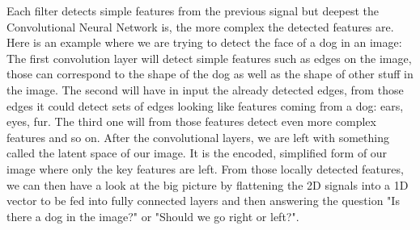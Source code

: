 \documentclass[12pt]{article}
\begin{document}
Each filter detects simple features from the previous signal but deepest the Convolutional Neural Network is, the more complex the detected features are. Here is an example where we are trying to detect the face of a dog in an image: 
The first convolution layer will detect simple features such as edges on the image, those can correspond to the shape of the dog as well as the shape of other stuff in the image. The second will have in input the already detected edges, from those edges it could detect sets of edges looking like features coming from a dog: ears, eyes, fur. The third one will from those features detect even more complex features and so on.
After the convolutional layers, we are left with something called the latent space of our image. It is the encoded, simplified form of our image where only the key features are left. From those locally detected features, we can then have a look at the big picture by flattening the 2D signals into a 1D vector to be fed into fully connected layers and then answering the question "Is there a dog in the image?" or "Should we go right or left?". \\
\end{document}
